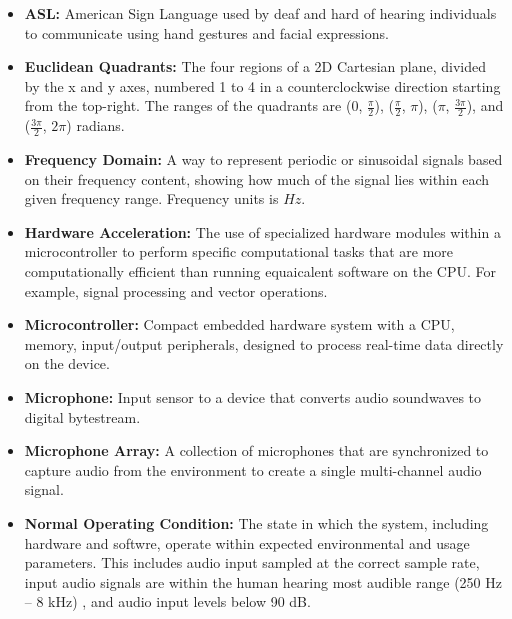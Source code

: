 \documentclass[12pt]{article}
\theoremstyle{definition}
\begin{document}
\begin{itemize}

  \item \textbf{ASL:} American Sign Language used by deaf and hard of hearing
  individuals to communicate using hand gestures and facial expressions.

  \item \textbf{Euclidean Quadrants:}\label{def:euclidean_quadrant}
  The four regions of a 2D Cartesian plane, divided by the x and y axes,
  numbered 1 to 4 in a counterclockwise direction starting from the top-right.
  The ranges of the quadrants are (0, $\frac{\pi}{2}$),
  ($\frac{\pi}{2}$, $\pi$), ($\pi$, $\frac{3\pi}{2}$), and
  ($\frac{3\pi}{2}$, $2\pi$) radians.

  \item \textbf{Frequency Domain:}\label{def:frequency_domain}
  A way to represent periodic or sinusoidal signals based on their frequency
  content, showing how much of the signal lies within each given frequency
  range. Frequency units is $Hz$.

  \item \textbf{Hardware Acceleration:}\label{def:hardware_acceleration}
  The use of specialized hardware modules within a microcontroller to perform
  specific computational tasks that are more computationally efficient than
  running equaicalent software on the CPU. For example, signal processing and
  vector operations.

  \item \textbf{Microcontroller:}\label{def:microcontroller} Compact embedded
  hardware system with a CPU, memory, input/output peripherals, designed to
  process real-time data directly on the device.

  \item \textbf{Microphone:}\label{def:microphone} Input sensor to a device that
  converts audio soundwaves to digital bytestream.

  \item \textbf{Microphone Array:}\label{def:microphone_array} A collection of
  microphones that are synchronized to capture audio from the environment to
  create a single multi-channel audio signal.

  \item \textbf{Normal Operating Condition:}
  \label{def:normal_operation_condition} The state in which the system,
  including hardware and softwre, operate within expected environmental and
  usage parameters. This includes audio input sampled at the correct sample
  rate, input audio signals are within the human hearing most audible range
  (250 Hz – 8 kHz) \cite{MiracleEar2025}, and audio input levels below 90 dB.


\end{itemize}
\end{document}
